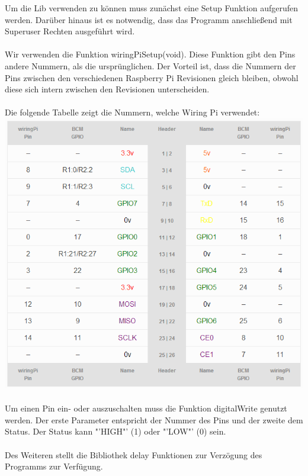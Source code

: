 Um die Lib verwenden zu können muss zunächst eine Setup Funktion aufgerufen werden. Darüber hinaus ist es notwendig, dass das Programm anschließend mit Superuser Rechten ausgeführt wird.\\
\\
Wir verwenden die Funktion wiringPiSetup(void). Diese Funktion gibt den Pins andere Nummern, als die ursprünglichen. Der Vorteil ist, dass die Nummern der Pins zwischen den verschiedenen Raspberry Pi Revisionen gleich bleiben, obwohl diese sich intern zwischen den Revisionen unterscheiden.\\
\\
Die folgende Tabelle zeigt die Nummern, welche Wiring Pi verwendet:\\
\includegraphics{GPIO_Pins.PNG}\\
\\
Um einen Pin ein- oder auszuschalten muss die Funktion digitalWrite genutzt werden. Der erste Parameter entspricht der Nummer des Pins und der zweite dem Status. Der Status kann "'HIGH"' (1) oder "'LOW"' (0) sein.\\
\\
Des Weiteren stellt die Bibliothek delay Funktionen zur Verzögung des Programms zur Verfügung.